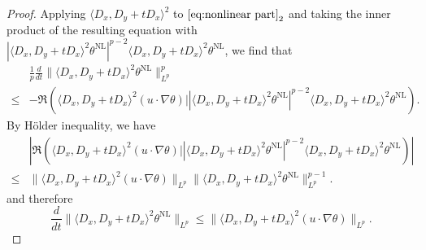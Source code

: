 \documentclass[reqno, 12pt]{amsart} %
\theoremstyle{plain} %
\theoremstyle{definition}
\theoremstyle{remark}
\numberwithin{equation}{section} %
\newcommand{\lt}{\left}
\newcommand{\rt}{\right}
\begin{document}
	\begin{proof}
		Applying $\langle D_x, D_y+t D_x\rangle^2$ to $\eqref{eq:nonlinear part}_2$ and taking the inner product of the resulting equation with $\left|\langle D_x, D_y+t D_x\rangle^2 \theta^{\mathrm{NL}}\right|^{p-2}\langle D_x, D_y+t D_x\rangle^2 \theta^{\mathrm{NL}}$, we find that
		$$
		\begin{aligned}
			&  \frac1p \frac{d}{ d t}\|\langle D_x, D_y+t D_x\rangle^2 \theta^{\mathrm{NL}}\|_{L^p}^p \\
			\leq & -\Re\lt(\langle D_x, D_y+t D_x\rangle^2\lt(u \cdot \nabla \theta\rt)   \Big| \lt|\langle D_x, D_y+t D_x\rangle^2 \theta^{\mathrm{NL}}\rt|^{p-2}\langle D_x, D_y+t D_x\rangle^2 \theta^{\mathrm{NL}}\right).
		\end{aligned}
		$$
		By Hölder inequality, we have
		$$
		\begin{aligned}
			& \left|  \Re\lt(\langle D_x, D_y+t D_x\rangle^2\lt(u \cdot \nabla \theta\rt)   \Big| \lt|\langle D_x, D_y+t D_x\rangle^2 \theta^{\mathrm{NL}}\rt|^{p-2}\langle D_x, D_y+t D_x\rangle^2 \theta^{\mathrm{NL}}\right)  \right| \\
			\leq & \|\langle D_x, D_y+t D_x\rangle^2(u \cdot \nabla \theta)\|_{L^p}\|\langle D_x, D_y+t D_x\rangle^2 \theta^{\mathrm{NL}}\|_{L^p}^{p-1}.
		\end{aligned}
		$$
		and therefore
		$$
		\frac{d}{d t}\|\langle D_x, D_y+t D_x\rangle^2 \theta^{\mathrm{NL}}\|_{L^p} \leq\|\langle D_x, D_y+t D_x\rangle^2(u \cdot \nabla \theta)\|_{L^p}.
		$$
		

\end{proof}
\end{document}
